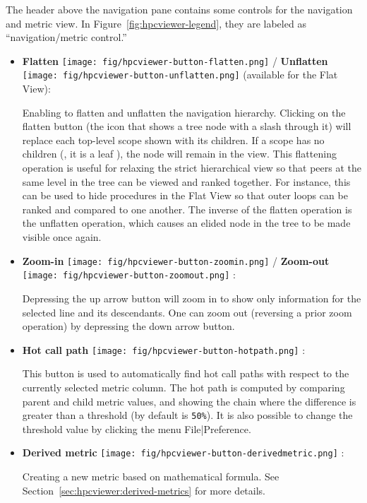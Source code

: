 The header above the navigation pane contains some controls for the navigation and metric view.
In Figure~\ref{fig:hpcviewer-legend}, they are labeled as ``navigation/metric control.''
\begin{itemize}

\item \textbf{Flatten} \texttt{[image: fig/hpcviewer-button-flatten.png]} /
      \textbf{Unflatten} \texttt{[image: fig/hpcviewer-button-unflatten.png]}
      (available for the Flat View):

Enabling to flatten and unflatten the navigation hierarchy.
Clicking on the flatten button (the icon that shows a tree node with a slash through it) will replace each top-level scope shown with its children.
If a scope has no children (\ie{}, it is a leaf ), the node will remain in the view.
This flattening operation is useful for relaxing the strict hierarchical view so that peers at the same level in the tree can be viewed and ranked together.
For instance, this can be used to hide procedures in the Flat View so that outer loops can be ranked and compared to one another.
The inverse of the flatten operation is the unflatten operation, which causes an elided node in the tree to be made visible once again.

\item \textbf{Zoom-in} \texttt{[image: fig/hpcviewer-button-zoomin.png]} /
      \textbf{Zoom-out} \texttt{[image: fig/hpcviewer-button-zoomout.png]} :

Depressing the up arrow button will zoom in to show only information for the selected line and its descendants.
One can zoom out (reversing a prior zoom operation) by depressing the down arrow button.

\item \textbf{Hot call path} \texttt{[image: fig/hpcviewer-button-hotpath.png]} :

This button is used to automatically find hot call paths with respect to the currently selected metric column.
The hot path is computed by comparing parent and child metric values, and showing the chain where the difference is greater than a threshold (by default is \texttt{50\%}).
It is also possible to change the threshold value by clicking the menu File|Preference.

\item \textbf{Derived metric} \texttt{[image: fig/hpcviewer-button-derivedmetric.png]} :

Creating a new metric based on mathematical formula.
See Section~\ref{sec:hpcviewer:derived-metrics} for more details.


\end{itemize}
